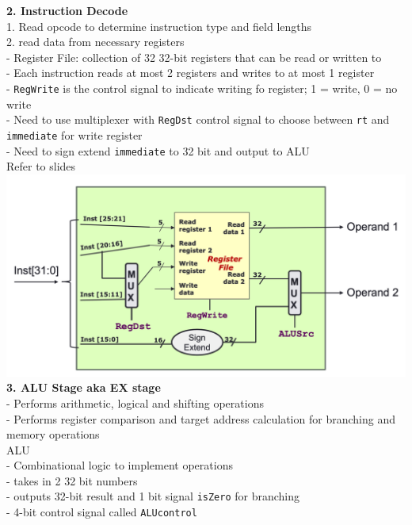 \documentclass[10pt, a4paper]{article}
\begin{document}
\begin{multicols*}{3}
		\textbf{2. Instruction Decode}\\
		1. Read opcode to determine instruction type and field lengths\\
		2. read data from necessary registers\\
		- Register File: collection of 32 32-bit registers that can be read or written to\\
		- Each instruction reads at most 2 registers and writes to at most 1 register\\
		- \texttt{RegWrite} is the control signal to indicate writing fo register; 1 = write, 0 = no write\\
		- Need to use multiplexer with \texttt{RegDst} control signal to choose between \texttt{rt} and \texttt{immediate} for write register\\
		- Need to sign extend \texttt{immediate} to 32 bit and output to ALU\\
		Refer to slides\\
		\includegraphics[scale=.27]{./assets/decodeStage}\\
		
		\textbf{3. ALU Stage aka EX stage}\\
		- Performs arithmetic, logical and shifting operations\\
		- Performs register comparison and target address calculation for branching and memory operations\\
		ALU\\
		- Combinational logic to implement operations\\
		- takes in 2 32 bit numbers\\
		- outputs 32-bit result and 1 bit signal \texttt{isZero} for branching\\
		- 4-bit control signal called \texttt{ALUcontrol}\\
		

\end{multicols*}
\end{document}
